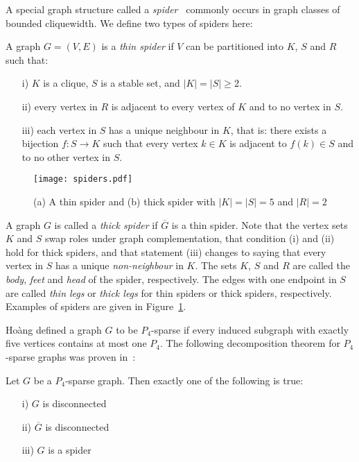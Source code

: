 \documentclass{llncs}
\begin{document}
A special graph structure called a \emph{spider}~\cite{JaOl} commonly occurs in graph classes of bounded cliquewidth. We define two types of spiders here:

\begin{definition}
A graph $G = (V,E)$ is a \emph{thin spider} if $V$ can be partitioned into $K$, $S$ and $R$ such that:
\begin{itemize}
\item[i)] $K$ is a clique, $S$ is a stable set, and $|K| = |S| \geq 2$.
\item[ii)] every vertex in $R$ is adjacent to every vertex of $K$ and to no vertex in $S$.
\item[iii)] each vertex in $S$ has a unique neighbour in $K$, that is: there exists a bijection $f:S \rightarrow K$ such that every vertex $k \in K$ is adjacent to $f(k) \in S$ and to no other vertex in $S$.
\end{itemize}
\end{definition}

\begin{figure}
    \hspace{2.6cm}
  \texttt{[image: spiders.pdf]}\\
  \caption{(a) A thin spider and (b) thick spider with $|K| = |S| = 5$ and $|R|=2$ }\label{spider}
\end{figure}

A graph $G$ is called a \emph{thick spider} if $\overline{G}$ is a thin spider. Note that the vertex sets $K$ and $S$ swap roles under graph complementation, that condition (i) and (ii) hold for thick spiders, and that statement (iii) changes to saying that every vertex in $S$ has a unique \emph{non-neighbour} in $K$. The sets $K$, $S$ and $R$ are called the \emph{body}, \emph{feet} and \emph{head} of the spider, respectively. The edges with one endpoint in $S$ are called \emph{thin legs} or \emph{thick legs} for thin spiders or thick spiders, respectively. Examples of spiders are given in Figure~\ref{spider}.

Ho\`ang \cite{Hoa} defined a graph $G$ to be $P_4$-sparse if every induced subgraph with exactly five vertices contains at most one $P_4$. The following decomposition theorem for $P_4$-sparse graphs was proven in~\cite{JaOl}:
\begin{lemma}\cite{JaOl}
Let $G$ be a $P_4$-sparse graph. Then exactly one of the following is true:
\begin{itemize}
\item[i)] $G$ is disconnected
\item[ii)] $\overline{G}$ is disconnected
\item[iii)] $G$ is a spider
\end{itemize}
\end{lemma}
\end{document}
